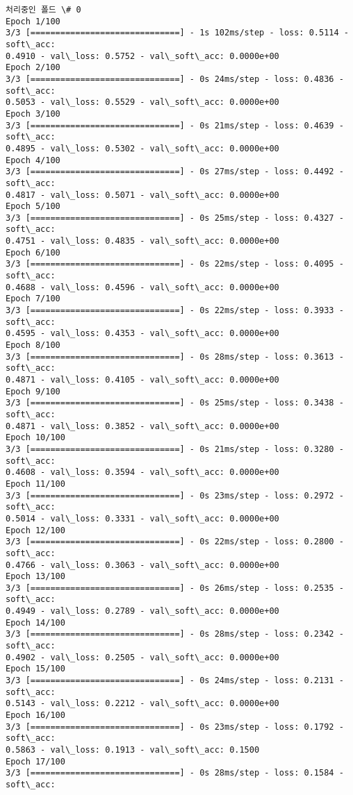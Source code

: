 \documentclass[11pt]{article}
\begin{document}
    \begin{Verbatim}[commandchars=\\\{\}]
처리중인 폴드 \# 0
Epoch 1/100
3/3 [==============================] - 1s 102ms/step - loss: 0.5114 - soft\_acc:
0.4910 - val\_loss: 0.5752 - val\_soft\_acc: 0.0000e+00
Epoch 2/100
3/3 [==============================] - 0s 24ms/step - loss: 0.4836 - soft\_acc:
0.5053 - val\_loss: 0.5529 - val\_soft\_acc: 0.0000e+00
Epoch 3/100
3/3 [==============================] - 0s 21ms/step - loss: 0.4639 - soft\_acc:
0.4895 - val\_loss: 0.5302 - val\_soft\_acc: 0.0000e+00
Epoch 4/100
3/3 [==============================] - 0s 27ms/step - loss: 0.4492 - soft\_acc:
0.4817 - val\_loss: 0.5071 - val\_soft\_acc: 0.0000e+00
Epoch 5/100
3/3 [==============================] - 0s 25ms/step - loss: 0.4327 - soft\_acc:
0.4751 - val\_loss: 0.4835 - val\_soft\_acc: 0.0000e+00
Epoch 6/100
3/3 [==============================] - 0s 22ms/step - loss: 0.4095 - soft\_acc:
0.4688 - val\_loss: 0.4596 - val\_soft\_acc: 0.0000e+00
Epoch 7/100
3/3 [==============================] - 0s 22ms/step - loss: 0.3933 - soft\_acc:
0.4595 - val\_loss: 0.4353 - val\_soft\_acc: 0.0000e+00
Epoch 8/100
3/3 [==============================] - 0s 28ms/step - loss: 0.3613 - soft\_acc:
0.4871 - val\_loss: 0.4105 - val\_soft\_acc: 0.0000e+00
Epoch 9/100
3/3 [==============================] - 0s 25ms/step - loss: 0.3438 - soft\_acc:
0.4871 - val\_loss: 0.3852 - val\_soft\_acc: 0.0000e+00
Epoch 10/100
3/3 [==============================] - 0s 21ms/step - loss: 0.3280 - soft\_acc:
0.4608 - val\_loss: 0.3594 - val\_soft\_acc: 0.0000e+00
Epoch 11/100
3/3 [==============================] - 0s 23ms/step - loss: 0.2972 - soft\_acc:
0.5014 - val\_loss: 0.3331 - val\_soft\_acc: 0.0000e+00
Epoch 12/100
3/3 [==============================] - 0s 22ms/step - loss: 0.2800 - soft\_acc:
0.4766 - val\_loss: 0.3063 - val\_soft\_acc: 0.0000e+00
Epoch 13/100
3/3 [==============================] - 0s 26ms/step - loss: 0.2535 - soft\_acc:
0.4949 - val\_loss: 0.2789 - val\_soft\_acc: 0.0000e+00
Epoch 14/100
3/3 [==============================] - 0s 28ms/step - loss: 0.2342 - soft\_acc:
0.4902 - val\_loss: 0.2505 - val\_soft\_acc: 0.0000e+00
Epoch 15/100
3/3 [==============================] - 0s 24ms/step - loss: 0.2131 - soft\_acc:
0.5143 - val\_loss: 0.2212 - val\_soft\_acc: 0.0000e+00
Epoch 16/100
3/3 [==============================] - 0s 23ms/step - loss: 0.1792 - soft\_acc:
0.5863 - val\_loss: 0.1913 - val\_soft\_acc: 0.1500
Epoch 17/100
3/3 [==============================] - 0s 28ms/step - loss: 0.1584 - soft\_acc:

\end{Verbatim}
\end{document}
